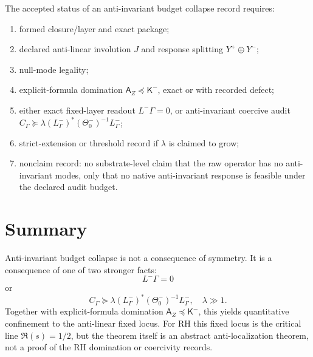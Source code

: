 \documentclass[11pt]{article}
\newcommand{\K}{\mathsf K}
\newcommand{\A}{\mathsf A}
\newcommand{\pre}{\preceq}
\newcommand{\suc}{\succeq}
\begin{document}
The accepted status of an anti-invariant budget collapse record requires:
\begin{enumerate}[label=(\roman*)]
\item formed closure/layer and exact package;
\item declared anti-linear involution \(J\) and response splitting \(Y^+\oplus Y^-\);
\item null-mode legality;
\item explicit-formula domination \(\A_Z\pre\K^-\), exact or with recorded defect;
\item either exact fixed-layer readout \(L^-\Gamma=0\), or anti-invariant coercive audit \(C_\Gamma\suc\lambda(L^-_\Gamma)^*(\Theta_0^-)^{-1}L^-_\Gamma\);
\item strict-extension or threshold record if \(\lambda\) is claimed to grow;
\item nonclaim record: no substrate-level claim that the raw operator has no anti-invariant modes, only that no native anti-invariant response is feasible under the declared audit budget.
\end{enumerate}

\section{Summary}

Anti-invariant budget collapse is not a consequence of symmetry. It is a consequence of one of two stronger facts:
\begin{equation}
\boxed{L^-\Gamma=0}
\end{equation}
or
\begin{equation}
\boxed{C_\Gamma\suc\lambda(L^-_\Gamma)^*(\Theta_0^-)^{-1}L^-_\Gamma,
\quad \lambda\gg1.}
\end{equation}
Together with explicit-formula domination \(\A_Z\pre\K^-\), this yields quantitative confinement to the anti-linear fixed locus. For RH this fixed locus is the critical line \(\Re(s)=1/2\), but the theorem itself is an abstract anti-localization theorem, not a proof of the RH domination or coercivity records.
\end{document}
